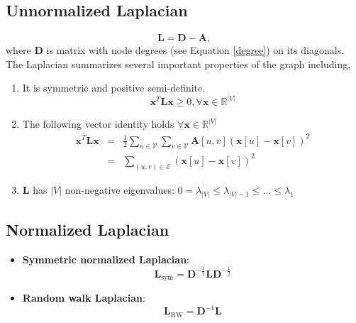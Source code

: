 \documentclass[twocolumn]{article}
\theoremstyle{plain}
\begin{document}
\subsection{Unnormalized Laplacian}

\begin{equation}
    \mathbf{L} = \mathbf{D} - \mathbf{A},
\end{equation}
where $\mathbf{D}$ is  matrix with node degrees (see Equation \ref{degree}) on its diagonals. The Laplacian summarizes several important properties of the graph including,

\begin{enumerate}
    \item It is symmetric and positive semi-definite.
        \begin{equation}
            \mathbf{x}^T\mathbf{L}\mathbf{x} \geq 0, \forall \mathbf{x} \in \mathbb{R}^{|V|}
        \end{equation}
    \item The following vector identity holds $\forall \mathbf{x} \in \mathbb{R}^{|V|}$
        \begin{eqnarray}
            \mathbf{x}^T\mathbf{L}\mathbf{x} &=& \frac{1}{2}\sum_{u \in \mathcal {V}}\sum_{v \in \mathcal{V}}\mathbf{A}[u,v](\mathbf{x}[u]-\mathbf{x}[v])^2\\
            &=& \sum_{(u,v) \in \mathcal{E}}(\mathbf{x}[u]-\mathbf{x}[v])^2
        \end{eqnarray}
    \item $\mathbf{L}$ has $|V|$ non-negative eigenvalues: $0=\lambda_{|V|} \leq \lambda_{|V|-1} \leq ... \leq \lambda_1$
\end{enumerate}

\subsection{Normalized Laplacian}

\begin{itemize}
    \item \textbf{Symmetric normalized Laplacian}: 
        \begin{equation}
            \mathbf{L}_{\text{sym}} = \mathbf{D}^{-\frac{1}{2}}\mathbf{L}\mathbf{D}^{-\frac{1}{2}}
        \end{equation}
    \item \textbf{Random walk Laplacian}:
        \begin{equation}
            \mathbf{L}_{\text{RW}} = \mathbf{D}^{-1}\mathbf{L}
        \end{equation}
\end{itemize}
\end{document}
